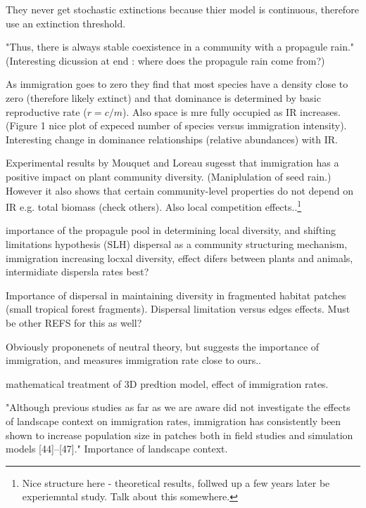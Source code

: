 They never get stochastic extinctions because thier model is continuous, therefore use an extinction threshold.

"Thus, there is always stable coexistence in a community
with a propagule rain." (Interesting dicussion at end : where does the propagule rain come from?)

As immigration goes to zero they find that most species have a density close to zero (therefore likely extinct) and that dominance is determined by  basic reproductive rate ($r=c/m$). Also space is mre fully occupied as IR increases. (Figure 1 nice plot of expeced number of species versus immigration intensity). Interesting change in dominance relationships (relative abundances) with IR. 

Experimental results by Mouquet and Loreau \cite{mouquet2004immigration} sugesst that immigration has a positive impact on plant community diversity. (Maniplulation of seed rain.) However  it also shows that certain community-level properties do not depend on IR e.g. total biomass (check others). Also local competition effects..\footnote{Nice structure here - theoretical results, follwed up a few years later be experiemntal study. Talk about this somewhere.}

\cite{foster2004propagule} importance of the propagule pool in determining local diversity, and shifting limitations hypothesis (SLH)
\cite{cadotte2006dispersal} dispersal as a community structuring mechanism, immigration increasing locxal diversity, effect difers between plants and animals, intermidiate dispersla rates best?

\cite{zartman2006habitat} Importance of dispersal in maintaining diversity in fragmented habitat patches (small tropical forest fragments). Dispersal limitation versus edges effects. Must be other REFS for this as well?

\cite{condit2012thirty} Obviously proponenets of neutral theory, but suggests the importance of immigration, and measures immigration rate close to ours..

\cite{drury2015immigration} mathematical treatment of 3D predtion model, effect of immigration rates. 

\cite{puettker2011immigration} "Although previous studies as far as we are aware did not investigate the effects of landscape context on immigration rates, immigration has consistently been shown to increase population size in patches both in field studies and simulation models [44]–[47]."  Importance of landscape context.

